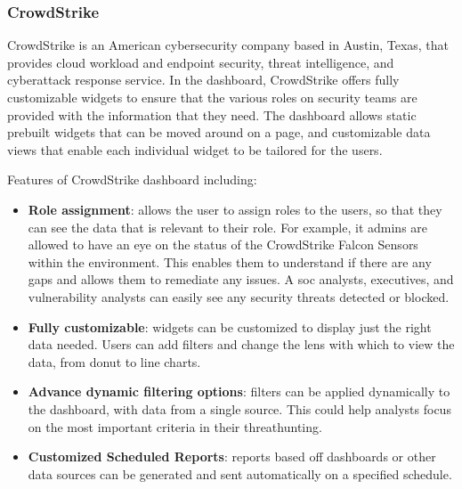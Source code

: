 \subsubsection{CrowdStrike}

CrowdStrike is an American cybersecurity company based in Austin, Texas, that provides cloud workload and
endpoint security, threat intelligence, and cyberattack response service. In the dashboard, CrowdStrike
offers fully customizable widgets to ensure that the various roles on security teams are provided with
the information that they need. The dashboard allows static prebuilt widgets that can be moved around on
a page, and customizable data views that enable each individual widget to be tailored for the users.

Features of CrowdStrike dashboard including:

\begin{itemize}
      \item \textbf{Role assignment}: allows the user to assign roles to the users, so that they can see
            the data that is relevant to their role. For example, \acrshort{it} admins are allowed to have
            an eye on the status of the CrowdStrike Falcon Sensors within the environment. This enables them
            to  understand if there are any gaps and allows them to remediate any issues. A \acrshort{soc}
            analysts, executives, and vulnerability analysts can easily see any security threats detected
            or blocked.
      \item \textbf{Fully customizable}: widgets can be customized to display just the right data needed.
            Users can add filters and change the lens with which to view the data, from donut to line charts.
      \item \textbf{Advance dynamic filtering options}: filters can be applied dynamically to the dashboard,
            with data from a single source. This could help analysts focus on the most important criteria
            in their \gls{threathunting}.
      \item \textbf{Customized Scheduled Reports}: reports based off dashboards or other data sources can
            be generated and sent automatically on a specified schedule.
\end{itemize}


